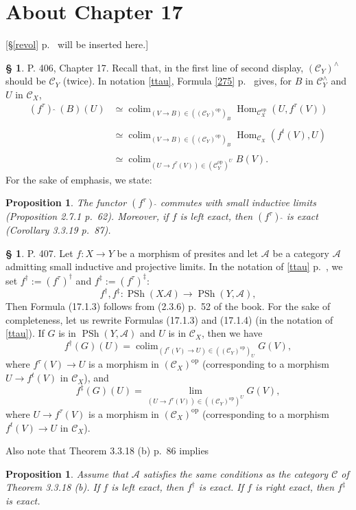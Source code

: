 \documentclass[12pt]{article}
\newtheorem{prop}[thm]{Proposition}
\theoremstyle{remark}
\theoremstyle{definition}
\newtheorem{s}[thm]{\S}
\newcommand{\A}{\mathcal A}
\newcommand{\C}{\mathcal C}
\DeclareMathOperator*{\co}{colim}
\DeclareMathOperator{\Hom}{Hom}%
\DeclareMathOperator{\op}{op}
\DeclareMathOperator{\PSh}{PSh}
\begin{document}
\section{About Chapter 17}
%
[\S\ref{revol} p.~\pageref{revol} will be inserted here.]
%
\begin{s}\label{fhat}
P. 406, Chapter 17. Recall that, in the first line of second display, $(\C_Y)^\wedge$ should be $\C_Y$ (twice). In notation \eqref{ttau}, Formula \eqref{275} p.~\pageref{275} gives, for $B$ in $\C_Y^\wedge$ and $U$ in $\C_X$,
%
\begin{equation*}
\begin{split}
(f^\tau)\ \widehat{}\ (B)(U)&\simeq\co_{(V\to B)\in((\C_Y)^{\op})_B}\Hom_{\C_X^{\op}}(U,f^\tau(V))
\\ \\ 
{}&\simeq\co_{(V\to B)\in((\C_Y)^{\op})_B}\Hom_{\C_X}(f^t(V),U)\\ \\ 
{}&\simeq\co_{(U\to f^\tau(V))\in(\C_Y^{\op})^U}B(V).
\end{split}
\end{equation*}
%
For the sake of emphasis, we state: 
%
\begin{prop}\label{p406}
The functor $(f^\tau)\ \widehat{}$ commutes with small inductive limits (Proposition 2.7.1 p.~62). Moreover, if $f$ is left exact, then $(f^\tau)\ \widehat{}$ is exact (Corollary 3.3.19 p.~87).
\end{prop}
\end{s}
%
%
\begin{s}\label{fdagger} 
P. 407. Let $f:X\to Y$ be a morphism of presites and let $\A$ be a category $\A$ admitting small inductive and projective limits. In the notation of \eqref{ttau} p.~\pageref{ttau}, we set $f^\dagger:=(f^\tau)^\dagger$ and $f^\ddagger:=(f^\tau)^\ddagger$: 
$$
f^\dagger,f^\ddagger:\PSh(X\A)\to\PSh(Y,\A),
$$
Then Formula (17.1.3) follows from (2.3.6) p.~52 of the book. For the sake of completeness, let us rewrite Formulas (17.1.3) and (17.1.4) (in the notation of \eqref{ttau}). If $G$ is in $\PSh(Y,\A)$ and $U$ is in $\C_X$, then we have
%
\begin{equation}\label{1713}
f^\dagger(G)(U)=\co_{(f^\tau(V)\to U)\in((\C_Y)^{\op})_U}G(V),
\end{equation}
%
where $f^\tau(V)\to U$ is a morphism in $(\C_X)^{\op}$ (corresponding to a morphism $U\to f^t(V)$ in $\C_X$), and
%
\begin{equation}\label{1714}
f^\ddagger(G)(U)=\lim_{(U\to f^\tau(V))\in((\C_Y)^{\op})^U}G(V),
\end{equation}
%
where $U\to f^\tau(V)$ is a morphism in $(\C_X)^{\op}$ (corresponding to a morphism $f^t(V)\to U$ in $\C_X$). 
%

Also note that Theorem 3.3.18 (b) p.~86 implies 
%
\begin{prop}\label{407}
Assume that $\A$ satisfies the same conditions as the category $\C$ of Theorem 3.3.18 (b). If $f$ is left exact, then $f^\dagger$ is exact. If $f$ is right exact, then $f^\ddagger$ is exact. 
\end{prop}
\end{s}
\end{document}
